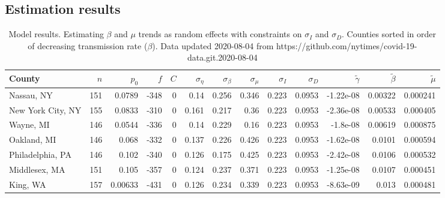 \documentclass[12pt,letterpaper]{article}
\begin{document}
\begin{appendices}
\begin{table}[h!]
\end{table}
\clearpage

\section{Estimation results}

\begin{sidewaystable}
\caption{\label{tab:cons}
Model results. Estimating $\beta$ and $\mu$ trends as random effects with 
constraints on  $\sigma_I$ and $\sigma_D$. 
Counties sorted in order of decreasing transmission rate ($\beta$).
Data updated 2020-08-04 from https://github.com/nytimes/covid-19-data.git.2020-08-04
}
\centering
{\scriptsize


\begin{tabular}{lrrrrrrrrrrrr}
\hline
 County             &   $n$ &   $p_0$ &    $f$ &   $C$ &   $\sigma_\eta$ &   $\sigma_\beta$ &   $\sigma_\mu$ &   $\sigma_I$ &   $\sigma_D$ &   $\tilde\gamma$ &   $\tilde{\beta}$ &   $\tilde{\mu}$ \\
\hline
 Nassau, NY         & 151   & 0.0789  & -348   &     0 &          0.14   &            0.256 &         0.346  &        0.223 &       0.0953 &        -1.22e-08 &           0.00322 &        0.000241 \\
 New York City, NY  & 155   & 0.0833  & -310   &     0 &          0.161  &            0.217 &         0.36   &        0.223 &       0.0953 &        -2.36e-08 &           0.00533 &        0.000405 \\
 Wayne, MI          & 146   & 0.0544  & -336   &     0 &          0.14   &            0.229 &         0.16   &        0.223 &       0.0953 &        -1.8e-08  &           0.00619 &        0.000875 \\
 Oakland, MI        & 146   & 0.068   & -332   &     0 &          0.137  &            0.226 &         0.426  &        0.223 &       0.0953 &        -1.62e-08 &           0.0101  &        0.000594 \\
 Philadelphia, PA   & 146   & 0.102   & -340   &     0 &          0.126  &            0.175 &         0.425  &        0.223 &       0.0953 &        -2.42e-08 &           0.0106  &        0.000532 \\
 Middlesex, MA      & 151   & 0.105   & -357   &     0 &          0.124  &            0.237 &         0.371  &        0.223 &       0.0953 &        -1.25e-08 &           0.0107  &        0.000451 \\
 King, WA           & 157   & 0.00633 & -431   &     0 &          0.126  &            0.234 &         0.339  &        0.223 &       0.0953 &        -8.63e-09 &           0.013   &        0.000481 \\

\end{tabular}}
\end{sidewaystable}
\end{appendices}
\end{document}

